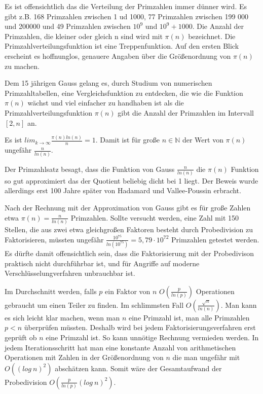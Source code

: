 \documentclass[a4paper,11pt]{article}
\begin{document}
Es ist offensichtlich das die Verteilung  der Primzahlen immer dünner
wird. Es gibt z.B. 168 Primzahlen zwischen 1 ud 1000, 77 Primzahlen
zwischen 199 000 und 200000  und 49 Primzahlen zwischen $10^9$ und
$10^9+1000$. Die Anzahl der Primzahlen, die kleiner oder gleich n sind
wird mit $\pi(n)$ bezeichnet. Die Primzahlverteilungsfunktion ist eine
Treppenfunktion.  Auf den ersten Blick erscheint es hoffnunglos, genauere
Angaben über die Größenordnung von $\pi(n)$ zu machen.

Dem 15 jährigen Gauss gelang es, durch Studium von numerischen
Primzahltabellen, eine Vergleichsfunktion zu entdecken, die wie die
Funktion $\pi(n)$ wächst und viel einfacher zu handhaben ist als die
Primzahlverteilungsfunktion $\pi(n)$ gibt die Anzahl der Primzahlen im
Intervall $[2,n] $ an.
\begin{center}
Es ist $lim_{k\rightarrow\infty} \frac{\pi(n)ln(n)}{n} = 1$. Damit
ist für große $n \in {\mathbb N}$ der Wert von $\pi(n)$ ungefähr
$\frac{n}{ln(n)}$.
\end{center}
Der Primzahlsatz besagt, dass die Funktion von Gauss $\frac{n}{ln(n)}$
die $\pi(n)$ Funktion so gut approximiert das der Quotient beliebig
dicht bei 1 liegt. Der Beweis wurde allerdings erst 100 Jahre später
von Hadamard und Vallee-Poussin erbracht.

Nach der Rechnung mit der Approximation von Gauss gibt es für große Zahlen
etwa $\pi(n) = \frac{n}{ln(n)}$ Primzahlen. Sollte versucht werden,
eine Zahl mit 150 Stellen, die  aus zwei  etwa gleichgroßen Faktoren
besteht durch Probedivision zu  Faktorisieren, müssten ungefähr
$\frac{10^75}{ln(10^75)}=5,79\cdot10^{72}$ Primzahlen getestet werden.
Es dürfte damit offensichtlich sein, dass die Faktorisierung mit der
Probedivison praktisch nicht durchführbar ist, und für Angriffe auf moderne
Verschlüsselungverfahren unbrauchbar ist.

Im Durchschnitt werden, falls $p$ ein Faktor von $n$ $O(\frac{p}{ln(p)})$ Operationen
gebraucht um einen Teiler zu finden. Im schlimmsten Fall $O(\frac{\sqrt{n}}{ln(n)})$.
Man kann es sich leicht klar machen, wenn man $n$ eine Primzahl ist, man
alle Primzahlen $p<n$ überprüfen müssten. Deshalb wird bei jedem
Faktorisierungsverfahren erst geprüft ob $n$ eine Primzahl ist. So
kann unnötige Rechnung vermieden werden. In jedem Iterationsschritt
hat man eine konstante Anzahl von arithmetischen Operationen mit Zahlen
in der Größenordnung von $n$ die man ungefähr mit $O((log\ n)^2)$
abschätzen kann. Somit wäre der Gesamtaufwand der
Probedivision $O(\frac{p}{ln(p)}(log\ n)^2)$.
\end{document}
